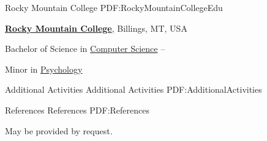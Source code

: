 \documentclass[letterpaper,MMMyyyy,nonstopmode]{simpleresumecv}
\begin{document}
\begin{Body}
\SubSection
{}
{Rocky Mountain College}
{PDF:RockyMountainCollegeEdu}

\Entry
\href{http://www.rocky.edu/}
{\textbf{Rocky Mountain College}},
Billings, MT, USA

\Gap
\BulletItem
Bachelor of Science in
\href{http://cs.rocky.edu/}
{Computer Science}
\hfill
{} --
\begin{Detail}
\SubBulletItem
Minor in 
\href{http://rocky.edu/academics/academic-programs/undergraduate-majors/psychology/}
{Psychology}
\end{Detail}


\Section
{Additional \newline Activities}
{Additional Activities}
{PDF:AdditionalActivities}


\Section
{References}
{References}
{PDF:References}

May be provided by request.

\end{Body}
\end{document}
